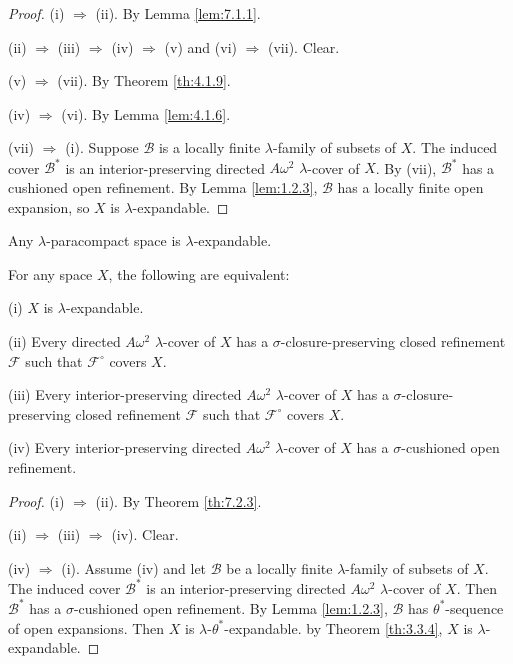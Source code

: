 \documentclass[jisng7iii.tex]{subfiles}
\begin{document}
\begin{proof}
(i) $\Rightarrow$ (ii). By Lemma \ref{lem:7.1.1}.

(ii) $\Rightarrow$ (iii) $\Rightarrow$ (iv) $\Rightarrow$ (v) and (vi) $\Rightarrow$ (vii). Clear. 

(v) $\Rightarrow$ (vii). By Theorem \ref{th:4.1.9}.

(iv) $\Rightarrow$ (vi). By Lemma \ref{lem:4.1.6}.

(vii) $\Rightarrow$ (i). Suppose $\mathscr{B}$ is a locally finite $\lambda$-family of subsets 
of $X$. The induced cover $\mathscr{B}^*$ is an interior-preserving directed $A\omega^2$ 
$\lambda$-cover of $X$. By (vii), $\mathscr{B}^*$ has a cushioned open refinement. 
By Lemma \ref{lem:1.2.3}, $\mathscr{B}$ has a locally finite open expansion, so $X$ is $\lambda$-expandable.
\end{proof}

{\corollary{} \label{cor:7.2.4}
Any $\lambda$-paracompact space is $\lambda$-expandable. \hfill\qedsymbol
}

{\theorem{} \label{th:7.2.5}
For any space $X$, the following are equivalent:

\textup{(i)}  $X$ is $\lambda$-expandable.


\textup{(ii)}  Every directed $A\omega^2$ $\lambda$-cover of $X$ has a $\sigma$-closure-preserving 
closed refinement $\mathscr{F}$ such that $\mathscr{F}^\circ$ covers $X$.


\textup{(iii)}  Every interior-preserving directed $A\omega^2$ $\lambda$-cover of $X$ has a $\sigma$-closure-preserving closed refinement $\mathscr{F}$ such that 
$\mathscr{F}^\circ$ covers $X$.

\textup{(iv)} Every interior-preserving directed $A\omega^2$ $\lambda$-cover of $X$ has a $\sigma$-cushioned open refinement.
}

\begin{proof}
(i) $\Rightarrow$ (ii). By Theorem \ref{th:7.2.3}.

(ii) $\Rightarrow$ (iii)  $\Rightarrow$ (iv). Clear.

(iv) $\Rightarrow$ (i).  Assume (iv) and let $\mathscr{B}$ be a locally finite $\lambda$-family
of subsets of  $X$. The induced cover $\mathscr{B}^*$ is an interior-preserving directed 
$A\omega^2$ $\lambda$-cover of  $X$. Then $\mathscr{B}^* $ has a 
$\sigma$-cushioned open refinement. By Lemma \ref{lem:1.2.3}, $\mathscr{B}$ 
has $\theta^*$-sequence of open expansions. Then 
$X$ is $\lambda$-$\theta^*$-expandable. by Theorem \ref{th:3.3.4},  
$X$ is $\lambda$-expandable.
\end{proof}
\end{document}
